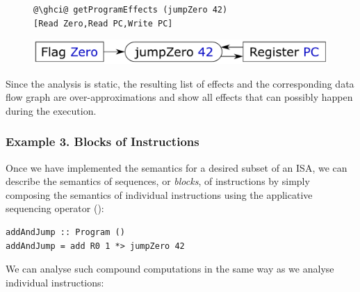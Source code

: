 \vspace{1mm}
\begin{figure}[!h]
 \begin{minipage}{0.45\textwidth}
\raggedleft
\begin{verbatim}
@\ghci@ getProgramEffects (jumpZero 42)
[Read Zero,Read PC,Write PC]
\end{verbatim}
 \end{minipage}
 \begin{minipage}{0.54\textwidth}
  \centering
  \includegraphics[scale=0.3]{fig/jumpZero.pdf}
 \end{minipage}
\end{figure}
\vspace{1mm}

\noindent
Since the analysis is static, the resulting list of effects and the
corresponding data flow graph are over-approximations and show all effects that
can possibly happen during the execution.


\subsubsection{Example 3. Blocks of Instructions}

Once we have implemented the semantics for a desired subset of an ISA, we can
describe the semantics of sequences, or \emph{blocks}, of instructions by
simply composing the semantics of individual instructions using the applicative
sequencing operator (\hs{*>}):

\begin{verbatim}
addAndJump :: Program ()
addAndJump = add R0 1 *> jumpZero 42
\end{verbatim}
\vspace{1mm}

\noindent
We can analyse such compound computations in the same way as we analyse
individual instructions:

